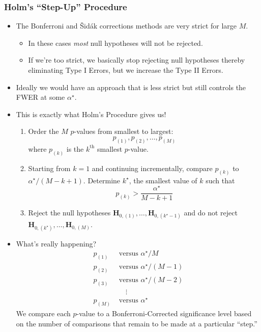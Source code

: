 \subsubsection*{Holm's ``Step-Up'' Procedure}
\begin{itemize}
      \item The Bonferroni and Šidák corrections methods are very strict for large $M$.
            \begin{itemize}
                  \item In these cases \emph{most} null hypotheses will not be rejected.
                  \item If we're too strict, we basically stop rejecting null hypotheses thereby
                        eliminating Type I Errors, but we increase the Type II Errors.
            \end{itemize}
      \item Ideally we would have an approach that is less strict but still controls the FWER at some $ \alpha^\star $.
      \item This is exactly what Holm's Procedure gives us!
            \begin{framed}
                  \begin{enumerate}
                        \item Order the $M$ $p$-values from smallest to largest:
                              \[ p_{(1)},p_{(2)},\ldots,p_{(M)} \]
                              where $ p_{(k)} $ is the $ k^{\text{th}} $ smallest $ p $-value.
                        \item Starting from $ k=1 $ and continuing incrementally, compare
                              $ p_{(k)} $ to $ \alpha^\star/(M-k+1) $. Determine $ k^\star $,
                              the smallest value of $ k $ such that
                              \[ p_{(k)}>\frac{\alpha^\star}{M-k+1} \]
                        \item Reject the null hypotheses $ \mathbf{H}_{0,(1)},\ldots,\mathbf{H}_{0,(k^\star-1)} $
                              and do not reject $ \mathbf{H}_{0,(k^\star)},\ldots,\mathbf{H}_{0,(M)} $.
                  \end{enumerate}
            \end{framed}
      \item What's really happening?
            \begin{align*}
                  p_{(1)} & \text{ versus } \alpha^\star/M     \\
                  p_{(2)} & \text{ versus } \alpha^\star/(M-1) \\
                  p_{(3)} & \text{ versus } \alpha^\star/(M-2) \\
                          & \quad\;\vdots                      \\
                  p_{(M)} & \text{ versus } \alpha^\star
            \end{align*}
            We compare each $ p $-value to a Bonferroni-Corrected significance
            level based on the number of comparisons that remain to be
            made at a particular ``step.''
\end{itemize}
